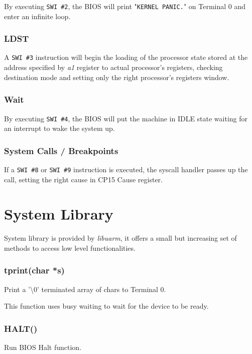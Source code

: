 By executing \texttt{SWI \#2}, the BIOS will print "\texttt{KERNEL PANIC.}" on Terminal 0 and enter an infinite loop.

\subsubsection{LDST}

A \texttt{SWI \#3} instruction will begin the loading of the processor state stored at the address specified by \emph{a1} register to actual processor's registers, checking destination mode and setting only the right processor's registers window.

\subsubsection{Wait}

By executing \texttt{SWI \#4}, the BIOS will put the machine in IDLE state waiting for an interrupt to wake the system up.

\subsubsection{System Calls / Breakpoints}

If a \texttt{SWI \#8} or \texttt{SWI \#9} instruction is executed, the syscall handler passes up the call, setting the right cause in CP15 Cause register.

\section{System Library}

System library is provided by \emph{libuarm}, it offers a small but increasing set of methods to access low level functionalities.

\subsubsection{tprint(char *s)}

Print a '\textbackslash0' terminated array of chars to Terminal 0.

This function uses busy waiting to wait for the device to be ready.

\subsubsection{HALT()}

Run BIOS Halt function.

